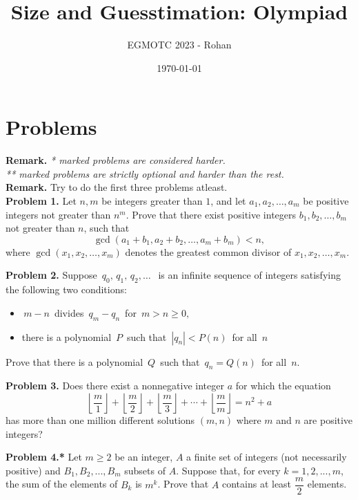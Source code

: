 \documentclass[12pt]{article}
\title{Size and Guesstimation: Olympiad}
\author{EGMOTC 2023 - Rohan}
\date{\today}
\begin{document}
\maketitle

\newcommand{\localtextbulletone}{\textcolor{black}{\raisebox{.45ex}{\rule{.6ex}{.6ex}}}}
\renewcommand{\labelitemi}{\localtextbulletone}

\section*{Problems}
\vspace{1cm}
\thispagestyle{empty}

\textbf{Remark.} \textit{* marked problems are considered harder.\\ ** marked problems are strictly optional and harder than the rest.\\}
\textbf{Remark.} Try to do the first three problems atleast.\\

\textbf{Problem 1.} Let $n, m$ be integers greater than $1$, and let $a_1, a_2, \dots, a_m$ be positive integers not greater than $n^m$. Prove that there exist positive integers $b_1, b_2, \dots, b_m$ not greater than $n$, such that\[ \gcd(a_1 + b_1, a_2 + b_2, \dots, a_m + b_m) < n, \]where $\gcd(x_1, x_2, \dots, x_m)$ denotes the greatest common divisor of $x_1, x_2, \dots, x_m$.

\textbf{Problem 2.} Suppose $\, q_{0}, \, q_{1}, \, q_{2}, \ldots \; \,$ is an infinite sequence of integers satisfying the following two conditions:
\begin{itemize}
    \item $\, m-n \,$ divides $\, q_{m}-q_{n}\,$ for $\, m > n \geq 0,$
    \item there is a polynomial $\, P \,$ such that $\, |q_{n}| < P(n) \,$ for all $\, n$
\end{itemize}

Prove that there is a polynomial $\, Q \,$ such that $\, q_{n}= Q(n) \,$ for all $\, n$.

\textbf{Problem 3.} Does there exist a nonnegative integer $a$ for which the equation
\[\left\lfloor\frac{m}{1}\right\rfloor + \left\lfloor\frac{m}{2}\right\rfloor + \left\lfloor\frac{m}{3}\right\rfloor + \cdots + \left\lfloor\frac{m}{m}\right\rfloor = n^2 + a\]has more than one million different solutions $(m, n)$ where $m$ and $n$ are positive integers?

\textbf{Problem 4.*} Let $m\ge 2$ be an integer, $A$ a finite set of integers (not necessarily positive) and $B_1,B_2,...,B_m$ subsets of $A$. Suppose that, for every $k=1,2,...,m$, the sum of the elements of $B_k$ is $m^k$. Prove that $A$ contains at least $\dfrac{m}{2}$ elements.\eject
\end{document}
